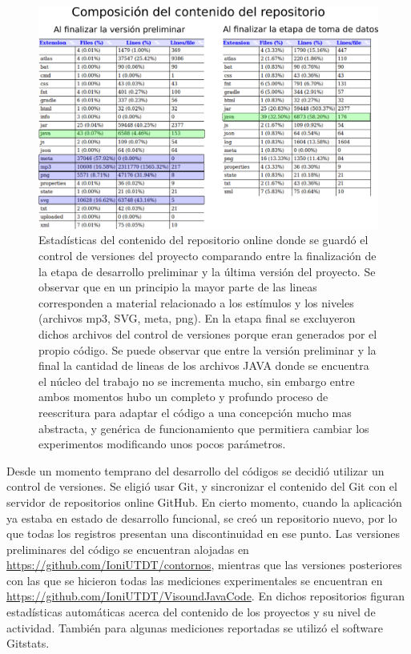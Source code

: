 \documentclass{article}
\numberwithin{figure}{section}
\begin{document}
    \begin{figure}
        \center
        \includegraphics[width=\textwidth]{Imagenes/Lineas.png}
        \caption{Estadísticas del contenido del repositorio online donde se guardó el control de versiones del proyecto comparando entre la finalización de la etapa de desarrollo preliminar y la última versión del proyecto. Se observar que en un principio la mayor parte de las lineas corresponden a material relacionado a los estímulos y los niveles (archivos mp3, SVG, meta, png). En la etapa final se excluyeron dichos archivos del control de versiones porque eran generados por el propio código. Se puede observar que entre la versión preliminar y la final la cantidad de lineas de los archivos JAVA donde se encuentra el núcleo del trabajo no se incrementa mucho, sin embargo entre ambos momentos hubo un completo y profundo proceso de reescritura para adaptar el código a una concepción mucho mas abstracta, y genérica de funcionamiento que permitiera cambiar los experimentos modificando unos pocos parámetros.}
        \label{fig:Lineas}
    \end{figure}
        
    Desde un momento temprano del desarrollo del códigos se decidió utilizar un control de versiones. Se eligió usar Git, y sincronizar el contenido del Git con el servidor de repositorios online GitHub. En cierto momento, cuando la aplicación ya estaba en estado de desarrollo funcional, se creó un repositorio nuevo, por lo que todas los registros presentan una discontinuidad en ese punto. Las versiones preliminares del código se encuentran alojadas en \url{https://github.com/IoniUTDT/contornos}, mientras que las versiones posteriores con las que se hicieron todas las mediciones experimentales se encuentran en \url{https://github.com/IoniUTDT/VisoundJavaCode}. En dichos repositorios figuran estadísticas automáticas acerca del contenido de los proyectos y su nivel de actividad. También para algunas mediciones reportadas se utilizó el software Gitstats.
    
\end{document}
